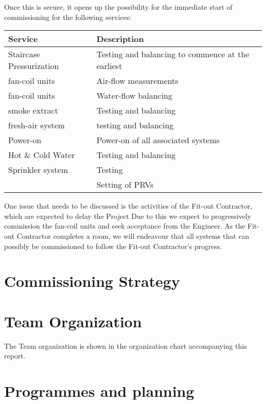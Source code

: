 Once this is secure, it opens up the possibility for the immediate start of commissioning for the following services:
\begin{table}[htbp]
\begin{tabular}{lp{2in}}
\toprule
Service & Description\\
\midrule
Staircase Pressurization & Testing and balancing to commence at the earliest\\
fan-coil units           & Air-flow measurements\\
fan-coil units           & Water-flow balancing\\
smoke extract            & Testing and balancing\\
fresh-air system         & testing and balancing\\
Power-on                 & Power-on of all associated systems\\
Hot \& Cold Water        & Testing and balancing\\
Sprinkler system         & Testing\\
~				    &	 Setting of PRVs\\
\bottomrule
\end{tabular}
\end{table}
\bigskip

One issue that needs to be discussed is the activities of the Fit-out Contractor, which are expected to delay the Project Due to this we expect to progressively commission the fan-coil units and seek acceptance from the Engineer. As the Fit-out Contractor completes a room, we will endeavour that all systems that can possibly be commissioned to follow the Fit-out Contractor's progress.




\section{Commissioning Strategy}

\section{Team Organization}
The Team organization is shown in the organization chart accompanying this report.
\section{Programmes and planning}

